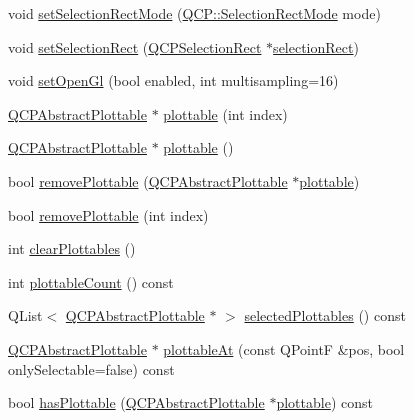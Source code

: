 \begin{DoxyCompactItemize}
void \mbox{\hyperlink{class_q_custom_plot_a810ef958ebe84db661c7288b526c0deb}{set\+Selection\+Rect\+Mode}} (\mbox{\hyperlink{namespace_q_c_p_ac9aa4d6d81ac76b094f9af9ad2d3aacf}{Q\+C\+P\+::\+Selection\+Rect\+Mode}} mode)
\item 
void \mbox{\hyperlink{class_q_custom_plot_a0c09f96df15faa4799ad7051bb16cf33}{set\+Selection\+Rect}} (\mbox{\hyperlink{class_q_c_p_selection_rect}{Q\+C\+P\+Selection\+Rect}} $\ast$\mbox{\hyperlink{class_q_custom_plot_ad7df2bcbba307e644db383b449e31efd}{selection\+Rect}})
\item 
void \mbox{\hyperlink{class_q_custom_plot_a7db1adc09016329f3aef7c60da935789}{set\+Open\+Gl}} (bool enabled, int multisampling=16)
\item 
\mbox{\hyperlink{class_q_c_p_abstract_plottable}{Q\+C\+P\+Abstract\+Plottable}} $\ast$ \mbox{\hyperlink{class_q_custom_plot_a32de81ff53e263e785b83b52ecd99d6f}{plottable}} (int index)
\item 
\mbox{\hyperlink{class_q_c_p_abstract_plottable}{Q\+C\+P\+Abstract\+Plottable}} $\ast$ \mbox{\hyperlink{class_q_custom_plot_adea38bdc660da9412ba69fb939031567}{plottable}} ()
\item 
bool \mbox{\hyperlink{class_q_custom_plot_af3dafd56884208474f311d6226513ab2}{remove\+Plottable}} (\mbox{\hyperlink{class_q_c_p_abstract_plottable}{Q\+C\+P\+Abstract\+Plottable}} $\ast$\mbox{\hyperlink{class_q_custom_plot_a32de81ff53e263e785b83b52ecd99d6f}{plottable}})
\item 
bool \mbox{\hyperlink{class_q_custom_plot_afc210e0021480f8119bccf37839dbcc8}{remove\+Plottable}} (int index)
\item 
int \mbox{\hyperlink{class_q_custom_plot_a9a409bb3201878adb7ffba1c89c4e004}{clear\+Plottables}} ()
\item 
int \mbox{\hyperlink{class_q_custom_plot_a5f4f15991c14bf9ad659bb2a19dfbed4}{plottable\+Count}} () const
\item 
Q\+List$<$ \mbox{\hyperlink{class_q_c_p_abstract_plottable}{Q\+C\+P\+Abstract\+Plottable}} $\ast$ $>$ \mbox{\hyperlink{class_q_custom_plot_a747faaab57c56891e901a1e97fa4359a}{selected\+Plottables}} () const
\item 
\mbox{\hyperlink{class_q_c_p_abstract_plottable}{Q\+C\+P\+Abstract\+Plottable}} $\ast$ \mbox{\hyperlink{class_q_custom_plot_acddbbd8b16dd633f0d94e5a736fbd8cf}{plottable\+At}} (const Q\+PointF \&pos, bool only\+Selectable=false) const
\item 
bool \mbox{\hyperlink{class_q_custom_plot_a72cefbfbb9e699940e37be605bd9c51e}{has\+Plottable}} (\mbox{\hyperlink{class_q_c_p_abstract_plottable}{Q\+C\+P\+Abstract\+Plottable}} $\ast$\mbox{\hyperlink{class_q_custom_plot_a32de81ff53e263e785b83b52ecd99d6f}{plottable}}) const

\end{DoxyCompactItemize}
